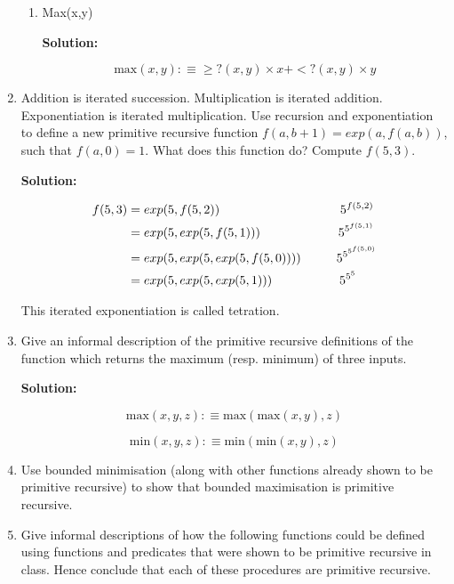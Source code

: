 \documentclass[11pt]{report}
\begin{document}
\begin{enumerate}
\begin{enumerate}
			\item Max(x,y)
			
			{\bf Solution:}
			
			$$\text{max}(x,y) :\equiv \geq?(x,y) \times x + <?(x,y) \times y$$
		
		\end{enumerate}
	
	\item Addition is iterated succession. Multiplication is iterated addition. Exponentiation is iterated multiplication. Use recursion and exponentiation to define a new primitive recursive function $f(a,b+1) = exp(a,f(a,b))$, such that $f(a,0) = 1$. What does this function do? Compute $f(5,3)$.
	
	{\bf Solution:}	
	
	\begin{align*}
		f(5,3) &= exp(5,f(5,2)) \hspace{3.4cm} 5^{f(5,2)}\\
		&= exp(5,exp(5,f(5,1))) \hspace{2.2cm} 5^{5^{f(5,1)}} \\
		&= exp(5, exp(5,exp(5,f(5,0)))) \hspace{1cm} 5^{5^{5^{f(5,0)}}} \\
		&= exp(5, exp(5,exp(5,1))) \hspace{1.9cm} 5^{5^{5}} 
	\end{align*}
		
	This iterated exponentiation is called tetration. 
	
	\item Give an informal description of the primitive recursive definitions of the function which returns the maximum (resp. minimum) of three inputs. 
	
	{\bf Solution:}

	$$\text{max}(x,y,z) :\equiv \text{max}(\text{max}(x,y),z)$$

	$$\text{min}(x,y,z) :\equiv \text{min}(\text{min}(x,y),z)$$

	\item Use bounded minimisation (along with other functions already shown to be primitive recursive) to show that bounded maximisation is primitive recursive.  

	\item Give informal descriptions of how the following functions could be defined using functions and predicates that were shown to be primitive recursive in class. Hence conclude that each of these procedures are primitive recursive. 
	

\end{enumerate}
\end{document}
